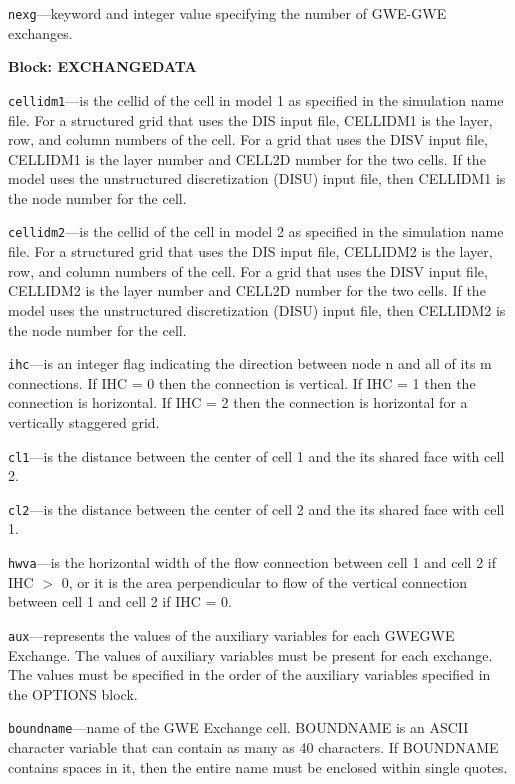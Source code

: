 \begin{description}
\item \texttt{nexg}---keyword and integer value specifying the number of GWE-GWE exchanges.

\end{description}
\item \textbf{Block: EXCHANGEDATA}

\begin{description}
\item \texttt{cellidm1}---is the cellid of the cell in model 1 as specified in the simulation name file. For a structured grid that uses the DIS input file, CELLIDM1 is the layer, row, and column numbers of the cell.   For a grid that uses the DISV input file, CELLIDM1 is the layer number and CELL2D number for the two cells.  If the model uses the unstructured discretization (DISU) input file, then CELLIDM1 is the node number for the cell.

\item \texttt{cellidm2}---is the cellid of the cell in model 2 as specified in the simulation name file. For a structured grid that uses the DIS input file, CELLIDM2 is the layer, row, and column numbers of the cell.   For a grid that uses the DISV input file, CELLIDM2 is the layer number and CELL2D number for the two cells.  If the model uses the unstructured discretization (DISU) input file, then CELLIDM2 is the node number for the cell.

\item \texttt{ihc}---is an integer flag indicating the direction between node n and all of its m connections. If IHC = 0 then the connection is vertical.  If IHC = 1 then the connection is horizontal. If IHC = 2 then the connection is horizontal for a vertically staggered grid.

\item \texttt{cl1}---is the distance between the center of cell 1 and the its shared face with cell 2.

\item \texttt{cl2}---is the distance between the center of cell 2 and the its shared face with cell 1.

\item \texttt{hwva}---is the horizontal width of the flow connection between cell 1 and cell 2 if IHC $>$ 0, or it is the area perpendicular to flow of the vertical connection between cell 1 and cell 2 if IHC = 0.

\item \texttt{aux}---represents the values of the auxiliary variables for each GWEGWE Exchange. The values of auxiliary variables must be present for each exchange. The values must be specified in the order of the auxiliary variables specified in the OPTIONS block.

\item \texttt{boundname}---name of the GWE Exchange cell.  BOUNDNAME is an ASCII character variable that can contain as many as 40 characters.  If BOUNDNAME contains spaces in it, then the entire name must be enclosed within single quotes.

\end{description}


